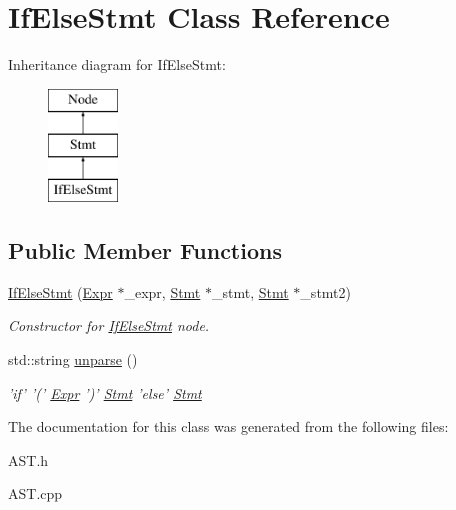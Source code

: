 \hypertarget{classIfElseStmt}{\section{If\-Else\-Stmt Class Reference}
\label{classIfElseStmt}
}
Inheritance diagram for If\-Else\-Stmt\-:\begin{figure}[H]
\begin{center}
\leavevmode
\includegraphics[height=3.000000cm]{classIfElseStmt}
\end{center}
\end{figure}
\subsection*{Public Member Functions}
\begin{DoxyCompactItemize}
\item 
\hypertarget{classIfElseStmt_a5f6717ee4f6c28af2f6d4b2efc7f5386}{\hyperlink{classIfElseStmt_a5f6717ee4f6c28af2f6d4b2efc7f5386}{If\-Else\-Stmt} (\hyperlink{classExpr}{Expr} $\ast$\-\_\-expr, \hyperlink{classStmt}{Stmt} $\ast$\-\_\-stmt, \hyperlink{classStmt}{Stmt} $\ast$\-\_\-stmt2)}\label{classIfElseStmt_a5f6717ee4f6c28af2f6d4b2efc7f5386}

\begin{DoxyCompactList}\small\item\em Constructor for \hyperlink{classIfElseStmt}{If\-Else\-Stmt} node. \end{DoxyCompactList}\item 
\hypertarget{classIfElseStmt_a82267559f8fdd5f10cf14e616f3867f2}{std\-::string \hyperlink{classIfElseStmt_a82267559f8fdd5f10cf14e616f3867f2}{unparse} ()}\label{classIfElseStmt_a82267559f8fdd5f10cf14e616f3867f2}

\begin{DoxyCompactList}\small\item\em 'if' '(' \hyperlink{classExpr}{Expr} ')' \hyperlink{classStmt}{Stmt} 'else' \hyperlink{classStmt}{Stmt} \end{DoxyCompactList}\end{DoxyCompactItemize}


The documentation for this class was generated from the following files\-:\begin{DoxyCompactItemize}
\item 
A\-S\-T.\-h\item 
A\-S\-T.\-cpp\end{DoxyCompactItemize}
